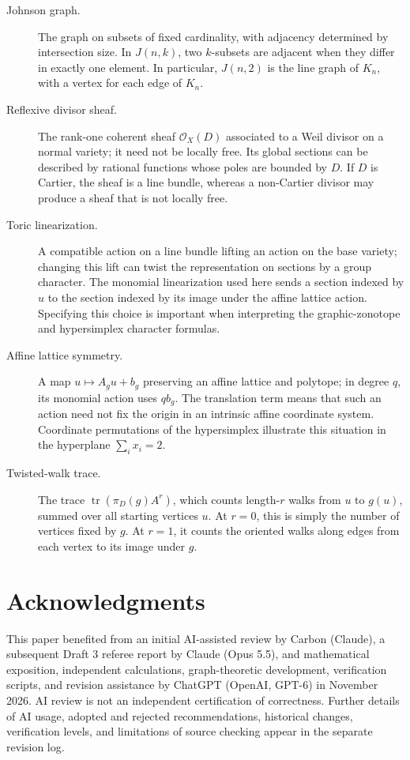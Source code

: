 \documentclass[12pt,letterpaper]{article}
\theoremstyle{definition}
\theoremstyle{remark}
\numberwithin{equation}{section}
\DeclareMathOperator{\tr}{tr}
\newcommand{\calO}{\mathcal O}
\begin{document}
\begin{description}
\item[Johnson graph.] The graph on subsets of fixed cardinality, with adjacency determined by intersection size. In $J(n,k)$, two $k$-subsets are adjacent when they differ in exactly one element. In particular, $J(n,2)$ is the line graph of $K_n$, with a vertex for each edge of $K_n$.
\item[Reflexive divisor sheaf.] The rank-one coherent sheaf $\calO_X(D)$ associated to a Weil divisor on a normal variety; it need not be locally free. Its global sections can be described by rational functions whose poles are bounded by $D$. If $D$ is Cartier, the sheaf is a line bundle, whereas a non-Cartier divisor may produce a sheaf that is not locally free.
\item[Toric linearization.] A compatible action on a line bundle lifting an action on the base variety; changing this lift can twist the representation on sections by a group character. The monomial linearization used here sends a section indexed by $u$ to the section indexed by its image under the affine lattice action. Specifying this choice is important when interpreting the graphic-zonotope and hypersimplex character formulas.
\item[Affine lattice symmetry.] A map $u\mapsto A_gu+b_g$ preserving an affine lattice and polytope; in degree $q$, its monomial action uses $qb_g$. The translation term means that such an action need not fix the origin in an intrinsic affine coordinate system. Coordinate permutations of the hypersimplex illustrate this situation in the hyperplane $\sum_i x_i=2$.
\item[Twisted-walk trace.] The trace $\tr(\pi_D(g)A^r)$, which counts length-$r$ walks from $u$ to $g(u)$, summed over all starting vertices $u$. At $r=0$, this is simply the number of vertices fixed by $g$. At $r=1$, it counts the oriented walks along edges from each vertex to its image under $g$.
\end{description}

\section*{Acknowledgments}
This paper benefited from an initial AI-assisted review by Carbon (Claude), a subsequent Draft 3 referee report by Claude (Opus 5.5), and mathematical exposition, independent calculations, graph-theoretic development, verification scripts, and revision assistance by ChatGPT (OpenAI, GPT-6) in November 2026. AI review is not an independent certification of correctness. Further details of AI usage, adopted and rejected recommendations, historical changes, verification levels, and limitations of source checking appear in the separate revision log.
\end{document}
